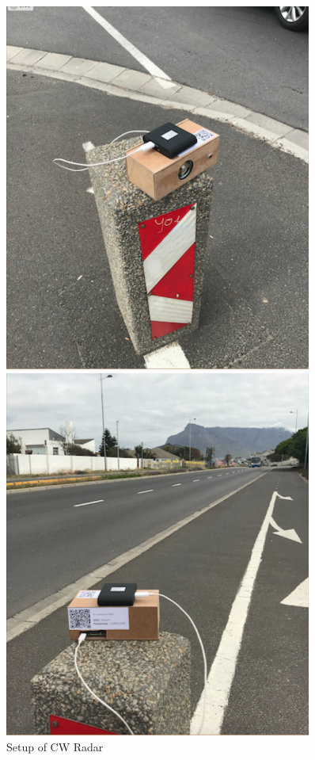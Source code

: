\begin{figure}[h!]
    \centering
    {\begin{minipage}{0.45\textwidth}
        \centering
        \includegraphics[width = 0.9\textwidth]{images/setup1.pdf}
    \end{minipage}\hfill
    \begin{minipage}{0.45\textwidth}
        \centering
        \includegraphics[width=0.9\textwidth]{images/setup2.pdf}
    \end{minipage}}\caption{Setup of CW Radar}\label{fig:setup1}
\end{figure}

